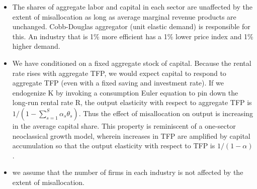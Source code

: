 \documentclass{article}
\begin{document}
\begin{itemize}
    \item The shares of aggregate labor and capital in each sector are unaffected by the extent of misallocation as long as average marginal revenue products are unchanged. Cobb-Douglas aggregator (unit elastic demand) is responsible for this. An industry that is 1\% more efficient has a 1\% lower price index and 1\% higher demand.
    \item We have conditioned on a fixed aggregate stock of capital. Because the rental rate rises with aggregate TFP, we would expect capital to respond to aggregate TFP (even with a fixed saving and investment rate). If we endogenize K by invoking a consumption Euler equation to pin down the long-run rental rate R, the output elasticity with respect to aggregate TFP is $1/(1-\sum_{s=1}^S\alpha_s\theta_s)$. Thus the effect of misallocation on output is increasing in the average capital share. This property is reminiscent of a one-sector neoclassical growth model, wherein increases in TFP are amplified by capital accumulation so that the output elasticity with respect to TFP is $1/(1 − α)$.
    \item we assume that the number of firms in each industry is not affected by the extent of misallocation.
\end{itemize}
\end{document}
